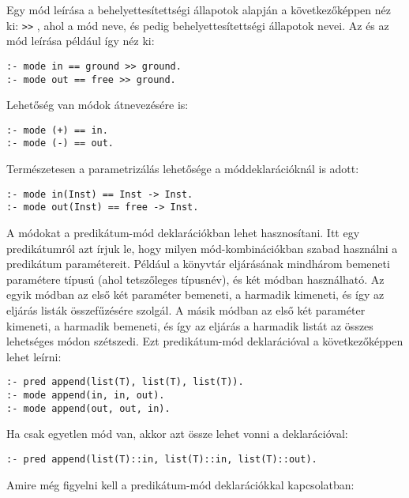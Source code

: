 Egy mód leírása a behelyettesítettségi állapotok alapján a következőképpen néz ki:
  \cd{==}  \verb`>>` , ahol
 a mód neve,  és  pedig behelyettesítettségi állapotok
nevei. Az  és az  mód leírása például így néz ki:

\begin{verbatim}
:- mode in == ground >> ground.
:- mode out == free >> ground.
\end{verbatim}

Lehetőség van módok átnevezésére is:   \cd{==} 

\begin{verbatim}
:- mode (+) == in.
:- mode (-) == out.
\end{verbatim}

Természetesen a parametrizálás lehetősége a móddeklarációknál is adott:

\begin{verbatim}
:- mode in(Inst) == Inst -> Inst.
:- mode out(Inst) == free -> Inst.
\end{verbatim}

A módokat a predikátum-mód deklarációkban lehet hasznosítani. Itt egy predikátumról
azt írjuk le, hogy milyen mód-kombinációkban szabad használni a predikátum paramétereit.
Például a  könyvtár  eljárásának mindhárom bemeneti paramétere
 típusú (ahol  tetszőleges típusnév), és két módban használható.
Az egyik módban az első két paraméter bemeneti, a harmadik kimeneti, és így az
eljárás listák összefűzésére szolgál. A másik módban az első két paraméter kimeneti,
a harmadik bemeneti, és így az eljárás a harmadik listát az összes lehetséges módon
szétszedi. Ezt predikátum-mód deklarációval a következőképpen lehet leírni:

\begin{verbatim}
:- pred append(list(T), list(T), list(T)).
:- mode append(in, in, out).
:- mode append(out, out, in).
\end{verbatim}

Ha csak egyetlen mód van, akkor azt össze lehet vonni a  deklarációval:

\begin{verbatim}
:- pred append(list(T)::in, list(T)::in, list(T)::out).
\end{verbatim}

Amire még figyelni kell a predikátum-mód deklarációkkal kapcsolatban:

